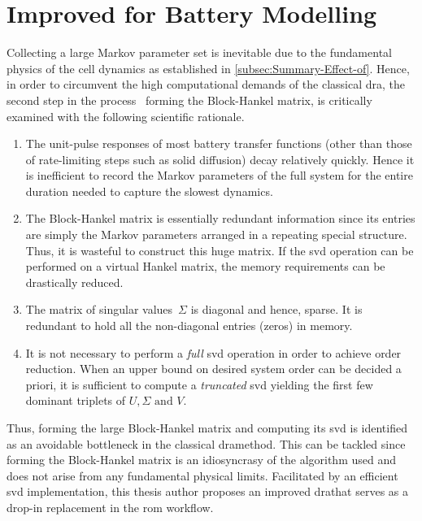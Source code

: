 \section{Improved  for Battery Modelling}\label{sec:Efficient-Computation-of}

Collecting a  large Markov parameter  set is  inevitable due to  the fundamental
physics of the cell  dynamics as established in \cref{subsec:Summary-Effect-of}.
Hence, in  order to circumvent the  high computational demands of  the classical
\gls{dra}, the second step in the process \ie~forming the Block-Hankel matrix,
is critically examined with the following scientific rationale.

\begin{enumerate}
	\item
        The unit-pulse responses of most  battery transfer functions (other than
        those of rate-limiting  steps such as solid  diffusion) decay relatively
        quickly. Hence it is inefficient to  record the Markov parameters of the
        full  system for  the  entire  duration needed  to  capture the  slowest
        dynamics.
	\item
        The Block-Hankel  matrix is essentially redundant  information since its
        entries are simply the Markov parameters arranged in a repeating special
        structure. Thus,  it is wasteful to  construct this huge matrix.  If the
        \gls{svd} operation  can be  performed on a  virtual Hankel  matrix, the
        memory requirements can be drastically reduced.
	\item
        The matrix of singular values~$\Sigma$ is diagonal and hence, sparse. It
        is redundant to hold all the non-diagonal entries (zeros) in memory.
	\item
        It  is not  necessary to  perform a  \emph{full} \gls{svd}  operation in
        order  to  achieve order  reduction.  When  an  upper bound  on  desired
        system order  can be  decided a  priori, it is  sufficient to  compute a
        \emph{truncated} \gls{svd}  yielding the first few  dominant triplets of
        $U, \Sigma \text{ and } V$.
\end{enumerate}
Thus,  forming the  large Block-Hankel  matrix  and computing  its \gls{svd}  is
identified as an avoidable bottleneck in the classical \gls{dra}method. This can
be  tackled since  forming the  Block-Hankel matrix  is an  idiosyncrasy of  the
algorithm  used  and  does  not  arise from  any  fundamental  physical  limits.
Facilitated  by  an  efficient  \gls{svd}  implementation,  this  thesis  author
proposes  an improved  \gls{dra}that  serves  as a  drop-in  replacement in  the
\gls{rom} workflow.

